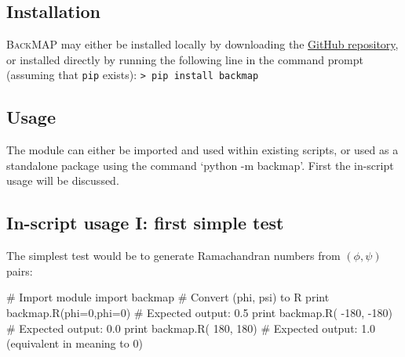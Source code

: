 \documentclass[fleqn,10pt,lineno]{wlpeerj} %
\newcommand{\gname}{BackMAP}
\newcommand{\pname}{\textsc{\gname}\xspace}
\newcommand{\code}[1]{\texttt{#1}\xspace}
\begin{document}
\subsection*{Installation}
\pname may either be installed locally by downloading the \href{https://github.com/ranjanmannige/backmap}{GitHub repository}, or installed directly by running the following line in the command prompt (assuming that \code{pip} exists): \code{> pip install backmap}

\subsection*{Usage}
The module can either be imported and used within existing scripts, or used as a standalone package using the command `python -m backmap'. First the in-script usage will be discussed.

\subsection*{In-script usage I: first simple test}
The simplest test would be to generate Ramachandran numbers from $(\phi,\psi)$ pairs:
\begin{python}
# Import module
import backmap 
# Convert (phi, psi) to R
print backmap.R(phi=0,phi=0) # Expected output: 0.5
print backmap.R( -180, -180) # Expected output: 0.0
print backmap.R(  180,  180) # Expected output: 1.0 (equivalent in meaning to 0)
\end{python}
\end{document}
